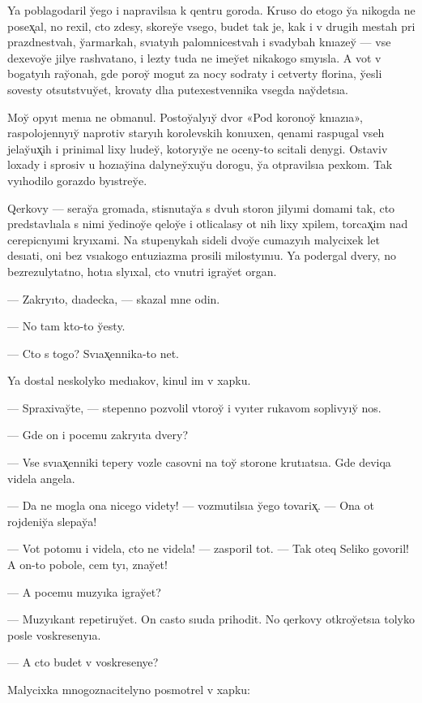 \documentclass[10pt]{book}
\begin{document}
Ya poblagodaril y̆ego i napravilsıa k qentru goroda. Kruso do etogo y̆a nikogda ne posex̨al, no rexil, cto zdesy, skorey̆e vsego, budet tak je, kak i v drugih mestah pri prazdnestvah, y̆armarkah, svıatyıh palomnicestvah i svadybah knıazey̆ — vse dexevoy̆e jilye rashvatano, i lezty tuda ne imey̆et nikakogo smyısla. A vot v bogatyıh ray̆onah, gde poroy̆ mogut za nocy sodraty i cetverty florina, y̆esli sovesty otsutstvuy̆et, krovaty dlıa putexestvennika vsegda nay̆detsıa.

Moy̆ opyıt menıa ne obmanul. Postoy̆alyıy̆ dvor «Pod koronoy̆ knıazıa», raspolojennyıy̆ naprotiv staryıh korolevskih konıuxen, qenami raspugal vseh jelay̆ux̨ih i prinimal lixy lıudey̆, kotoryıy̆e ne oceny-to scitali denygi. Ostaviv loxady i sprosiv u hozıay̆ina dalyney̆xuy̆u dorogu, y̆a otpravilsıa pexkom. Tak vyıhodilo gorazdo byıstrey̆e.

Qerkovy — seray̆a gromada, stisnutay̆a s dvuh storon jilyımi domami tak, cto predstavlıala s nimi y̆edinoy̆e qeloy̆e i otlicalasy ot nih lixy xpilem, torcax̨im nad cerepicnyımi kryıxami. Na stupenykah sideli dvoy̆e cumazyıh malycixek let desıati, oni bez vsıakogo entuziazma prosili milostyınıu. Ya podergal dvery, no bezrezulytatno, hotıa slyıxal, cto vnutri igray̆et organ.

— Zakryıto, dıadecka, — skazal mne odin.

— No tam kto-to y̆esty.

— Cto s togo? Svıax̨ennika-to net.

Ya dostal neskolyko medıakov, kinul im v xapku.

— Spraxivay̆te, — stepenno pozvolil vtoroy̆ i vyıter rukavom soplivyıy̆ nos.

— Gde on i pocemu zakryıta dvery?

— Vse svıax̨enniki tepery vozle casovni na toy̆ storone krutıatsıa. Gde deviqa videla angela.

— Da ne mogla ona nicego videty! — vozmutilsıa y̆ego tovarix̨. — Ona ot rojdeniy̆a slepay̆a!

— Vot potomu i videla, cto ne videla! — zasporil tot. — Tak oteq Seliko govoril! A on-to pobole, cem tyı, znay̆et!

— A pocemu muzyıka igray̆et?

— Muzyıkant repetiruy̆et. On casto sıuda prihodit. No qerkovy otkroy̆etsıa tolyko posle voskresenyıa.

— A cto budet v voskresenye?

Malycixka mnogoznacitelyno posmotrel v xapku:
\end{document}
